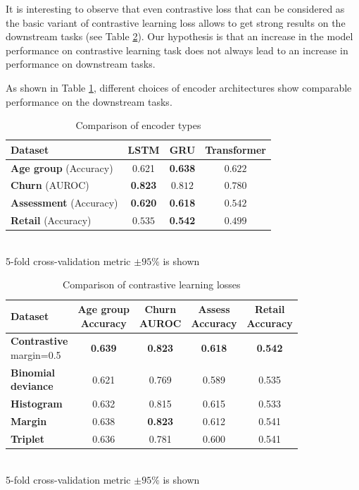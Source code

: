 \documentclass[sigconf]{acmart}
\begin{document}
It is interesting to observe that even contrastive loss that can be considered as the basic variant of contrastive learning loss allows to get strong results on the downstream tasks (see Table \ref{tab-loss-type}). Our hypothesis is that an increase in the model performance on contrastive learning task does not always lead to an increase in performance on downstream tasks.

As shown in Table \ref{tab-enc-type}, different choices of encoder architectures show comparable performance on the downstream tasks.

\begin{table}
\centering
\caption{Comparison of encoder types}
\begin{tabular}{lccc}
\toprule
\textbf{Dataset} & \textbf{LSTM} & \textbf{GRU} & \textbf{Transformer} \\
\midrule
\textbf{Age group} \small{(Accuracy)} & 0.621 & \textbf{0.638} & $0.622$ \\
\textbf{Churn} \small{(AUROC)} & \textbf{0.823} & $0.812$ & $0.780$ \\
\textbf{Assessment} \small{(Accuracy)} & \textbf{0.620} & \textbf{0.618} & $0.542$  \\
\textbf{Retail} \small{(Accuracy)} & $0.535$ & \textbf{0.542} & $0.499$ \\
\bottomrule
\end{tabular} \\
\small{5-fold cross-validation metric $\pm 95\%$ is shown}
\label{tab-enc-type}
\end{table}

\begin{table}
\centering
\caption{Comparison of contrastive learning losses}
\begin{tabular}{lcccc}
\toprule

\textbf{Dataset} &
\makecell{\textbf{Age group} \\ \small{Accuracy}} & \makecell{\textbf{Churn} \\ \small{AUROC}} & \makecell{\textbf{Assess} \\ \small{Accuracy}} & \makecell{\textbf{Retail} \\ \small{Accuracy}} \\
\midrule

\makecell[l]{\textbf{Contrastive} \\ \small{margin=0.5}} & \textbf{0.639} & \textbf{0.823} & \textbf{0.618} & \textbf{0.542} \\
\makecell[l]{\textbf{Binomial} \\ \textbf{deviance}} & 0.621 & 0.769 & 0.589 & 0.535 \\
\textbf{Histogram} & 0.632 & 0.815 & 0.615 & 0.533 \\
\textbf{Margin} & 0.638 & \textbf{0.823} & 0.612 & 0.541 \\
\textbf{Triplet} & 0.636 & 0.781 & 0.600 & 0.541 \\

\bottomrule
\end{tabular} \\
\small{5-fold cross-validation metric $\pm 95\%$ is shown}
\label{tab-loss-type}
\end{table}
\end{document}
